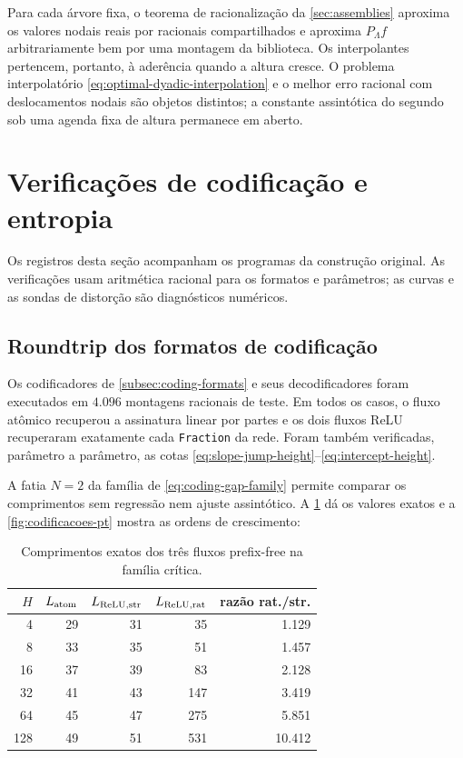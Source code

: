 \documentclass[11pt,a4paper]{article}
\theoremstyle{definition}
\theoremstyle{remark}
\begin{document}
Para cada árvore fixa, o teorema de racionalização da \cref{sec:assemblies}
aproxima os valores nodais reais por racionais compartilhados e aproxima
$P_\Lambda f$ arbitrariamente bem por uma montagem da biblioteca. Os
interpolantes pertencem, portanto, à aderência quando a altura cresce. O
problema interpolatório \eqref{eq:optimal-dyadic-interpolation} e o melhor
erro racional com deslocamentos nodais são objetos distintos; a constante
assintótica do segundo sob uma agenda fixa de altura permanece em aberto.
\section{Verificações de codificação e entropia}
\label{sec:coding-validation}
Os registros desta seção acompanham os programas da construção original. As verificações usam aritmética racional para os formatos e parâmetros; as curvas e as sondas de distorção são diagnósticos numéricos.

\subsection{Roundtrip dos formatos de codificação}

Os codificadores de \cref{subsec:coding-formats} e seus decodificadores foram
executados em $4.096$ montagens racionais de teste. Em
todos os casos, o fluxo atômico recuperou a assinatura linear por partes e os
dois fluxos ReLU recuperaram exatamente cada \texttt{Fraction} da rede. Foram
também verificadas, parâmetro a parâmetro, as cotas
\eqref{eq:slope-jump-height}--\eqref{eq:intercept-height}.

A fatia $N=2$ da família de \eqref{eq:coding-gap-family} permite comparar os
comprimentos sem regressão nem ajuste assintótico. A
\cref{tab:codificacoes-pt} dá os valores exatos e a
\cref{fig:codificacoes-pt} mostra as ordens de crescimento:
\begin{table}[t]
\centering
\caption{Comprimentos exatos dos três fluxos prefix-free na família crítica.}
\label{tab:codificacoes-pt}
\small
\begin{tabular}{rrrrr}
\toprule
$H$ & $L_{\rm atom}$ & $L_{\rm ReLU,str}$ & $L_{\rm ReLU,rat}$ & razão rat./str.\\
\midrule
4 & 29 & 31 & 35 & 1.129\\
8 & 33 & 35 & 51 & 1.457\\
16 & 37 & 39 & 83 & 2.128\\
32 & 41 & 43 & 147 & 3.419\\
64 & 45 & 47 & 275 & 5.851\\
128 & 49 & 51 & 531 & 10.412\\
\bottomrule
\end{tabular}

\end{table}
\end{document}
